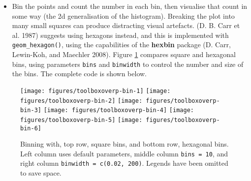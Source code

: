 \begin{itemize}
\itemsep1pt\parskip0pt
\item
  Bin the points and count the number in each bin, then visualise that
  count in some way (the 2d generalisation of the histogram). Breaking
  the plot into many small squares can produce distracting visual
  artefacts. (D. B. Carr et al. 1987) suggests using hexagons instead,
  and this is implemented with \texttt{geom\_hexagon()}, using the
  capabilities of the \textbf{hexbin} package (D. Carr, Lewin-Koh, and
  Maechler 2008). Figure \ref{fig:overp-bin} compares square and
  hexagonal bins, using parameters \texttt{bins} and \texttt{binwidth}
  to control the number and size of the bins. The complete code is shown
  below.  
    
\end{itemize}

\begin{Shaded}
\begin{Highlighting}[]
\StringTok{ }\StringTok{ }\NormalTok{(}\NormalTok{, }\NormalTok{) +}
\StringTok{  }\NormalTok{(} \NormalTok{)}
\StringTok{ }\NormalTok{()}
\StringTok{ }\NormalTok{(} \NormalTok{)}
\StringTok{ }\NormalTok{(}\NormalTok{(}\NormalTok{, }\NormalTok{))}
\StringTok{ }\NormalTok{()}
\StringTok{ }\NormalTok{(} \NormalTok{)}
\StringTok{ }\NormalTok{(}\NormalTok{(}\NormalTok{, }\NormalTok{))}
\end{Highlighting}
\end{Shaded}

\begin{figure}

{\centering \texttt{[image: figures/toolboxoverp-bin-1]} \texttt{[image: figures/toolboxoverp-bin-2]} \texttt{[image: figures/toolboxoverp-bin-3]} \texttt{[image: figures/toolboxoverp-bin-4]} \texttt{[image: figures/toolboxoverp-bin-5]} \texttt{[image: figures/toolboxoverp-bin-6]} 

}

\caption{Binning with, top row, square bins, and bottom row, hexagonal bins. Left column uses default parameters, middle column \texttt{bins = 10}, and right column \texttt{binwidth = c(0.02, 200)}. Legends have been omitted to save space.\label{fig:overp-bin}}
\end{figure}

